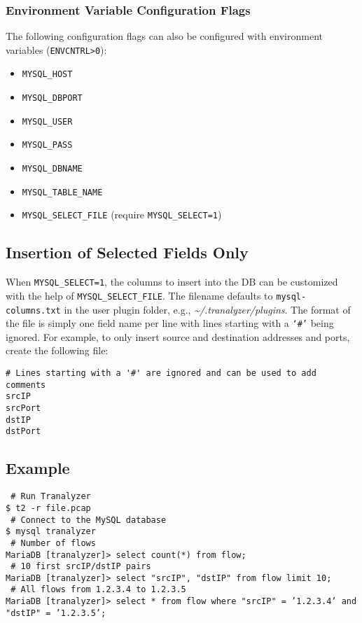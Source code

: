 \documentclass[documentation]{subfiles}
\begin{document}
\subsubsection{Environment Variable Configuration Flags}
The following configuration flags can also be configured with environment variables ({\tt ENVCNTRL>0}):
\begin{itemize}
    \item {\tt MYSQL\_HOST}
    \item {\tt MYSQL\_DBPORT}
    \item {\tt MYSQL\_USER}
    \item {\tt MYSQL\_PASS}
    \item {\tt MYSQL\_DBNAME}
    \item {\tt MYSQL\_TABLE\_NAME}
    \item {\tt MYSQL\_SELECT\_FILE} (require {\tt MYSQL\_SELECT=1})
\end{itemize}

\subsection{Insertion of Selected Fields Only}\label{mysql:select}

When {\tt MYSQL\_SELECT=1}, the columns to insert into the DB can be customized with the help of {\tt MYSQL\_SELECT\_FILE}.
The filename defaults to {\tt mysql-columns.txt} in the user plugin folder, e.g., {\em \textasciitilde{}/.tranalyzer/plugins}.
The format of the file is simply one field name per line with lines starting with a {\tt `\#'} being ignored.
For example, to only insert source and destination addresses and ports, create the following file:

\begin{verbatim}
# Lines starting with a '#' are ignored and can be used to add comments
srcIP
srcPort
dstIP
dstPort
\end{verbatim}

\subsection{Example}
{\tt\color{blue} \# Run Tranalyzer}\\
{\tt \$ t2 -r file.pcap}\\
{\tt\color{blue} \# Connect to the MySQL database}\\
{\tt \$ mysql tranalyzer}\\
{\tt\color{blue} \# Number of flows}\\
{\tt MariaDB [tranalyzer]> select count(*) from flow;}\\
{\tt\color{blue} \# 10 first srcIP/dstIP pairs}\\
{\tt MariaDB [tranalyzer]> select "srcIP", "dstIP" from flow limit 10;}\\
{\tt\color{blue} \# All flows from 1.2.3.4 to 1.2.3.5}\\
{\tt MariaDB [tranalyzer]> select * from flow where "srcIP" = '1.2.3.4' and "dstIP" = '1.2.3.5';}
\end{document}
